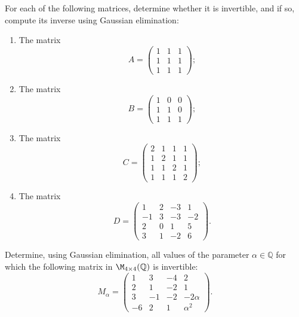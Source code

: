 \begin{exercise}
\label{exc:explicit_inversion_matrices}
For each of the following matrices, determine whether it is invertible, and if so, compute its inverse using Gaussian elimination:
\begin{enumerate}
    \item The matrix
    \[
    A = \begin{pmatrix} 1 & 1 & 1 \\ 1 & 1 & 1 \\ 1 & 1 & 1 \end{pmatrix};
    \]
    \item The matrix
    \[
    B = \begin{pmatrix} 1 & 0 & 0 \\ 1 & 1 & 0 \\ 1 & 1 & 1 \end{pmatrix};
    \]
    \item The matrix
    \[
    C = \begin{pmatrix} 2 & 1 & 1 & 1 \\ 1 & 2 & 1 & 1 \\ 1 & 1 & 2 & 1 \\ 1 & 1 & 1 & 2 \end{pmatrix};
    \]
    \item The matrix
    \[
    D = \begin{pmatrix} 1 & 2 & -3 & 1 \\ -1 & 3 & -3 & -2 \\ 2 & 0 & 1 & 5 \\ 3 & 1 & -2 & 6 \end{pmatrix}.
    \]
\end{enumerate}
\end{exercise}

\begin{exercise}
\label{exc:parametric_gaussian_elimination_invertibility}
Determine, using Gaussian elimination, all values of the parameter $\alpha \in \mathbb{Q}$ for which the following matrix in $\M_{4 \times 4}(\mathbb{Q})$ is invertible:
\[
M_\alpha = \begin{pmatrix}
1 & 3 & -4 & 2 \\
2 & 1 & -2 & 1 \\
3 & -1 & -2 & -2\alpha \\
-6 & 2 & 1 & \alpha^2
\end{pmatrix}.
\]
\end{exercise}

